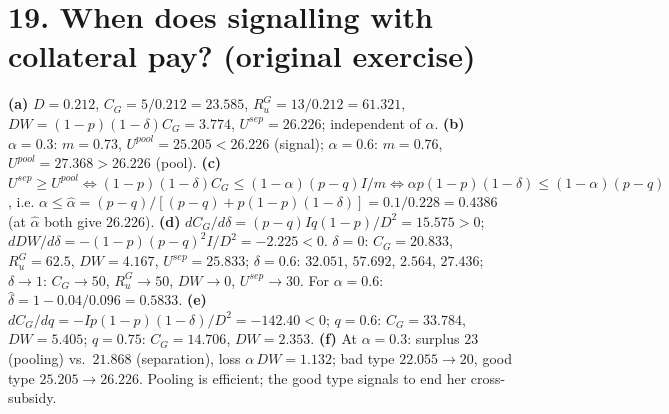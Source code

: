\documentclass[11pt,a4paper]{article}
\begin{document}
\section*{19. When does signalling with collateral pay? (original exercise)}

\textbf{(a)} $D=0.212$, $C_G=5/0.212=23.585$, $R_u^G=13/0.212=61.321$, $DW=(1-p)(1-\delta)C_G=3.774$, $U^{sep}=26.226$; independent of $\alpha$.
\textbf{(b)} $\alpha=0.3$: $m=0.73$, $U^{pool}=25.205<26.226$ (signal); $\alpha=0.6$: $m=0.76$, $U^{pool}=27.368>26.226$ (pool).
\textbf{(c)} $U^{sep}\ge U^{pool}\iff(1-p)(1-\delta)C_G\le(1-\alpha)(p-q)I/m\iff\alpha p(1-p)(1-\delta)\le(1-\alpha)(p-q)$, i.e.
$\alpha\le\hat\alpha=(p-q)/[(p-q)+p(1-p)(1-\delta)]=0.1/0.228=0.4386$ (at $\hat\alpha$ both give $26.226$).
\textbf{(d)} $dC_G/d\delta=(p-q)Iq(1-p)/D^2=15.575>0$; $dDW/d\delta=-(1-p)(p-q)^2I/D^2=-2.225<0$.
$\delta=0$: $C_G=20.833$, $R_u^G=62.5$, $DW=4.167$, $U^{sep}=25.833$; $\delta=0.6$: $32.051$, $57.692$, $2.564$, $27.436$;
$\delta\to1$: $C_G\to50$, $R_u^G\to50$, $DW\to0$, $U^{sep}\to30$. For $\alpha=0.6$: $\hat\delta=1-0.04/0.096=0.5833$.
\textbf{(e)} $dC_G/dq=-Ip(1-p)(1-\delta)/D^2=-142.40<0$; $q=0.6$: $C_G=33.784$, $DW=5.405$; $q=0.75$: $C_G=14.706$, $DW=2.353$.
\textbf{(f)} At $\alpha=0.3$: surplus $23$ (pooling) vs.\ $21.868$ (separation), loss $\alpha\,DW=1.132$; bad type $22.055\to20$, good
type $25.205\to26.226$. Pooling is efficient; the good type signals to end her cross-subsidy.
\end{document}
